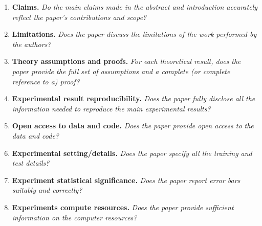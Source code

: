 \documentclass[11pt]{article}
\begin{document}
\begin{enumerate}[leftmargin=2em,itemsep=4pt]

\item \textbf{Claims.}
\textit{Do the main claims made in the abstract and introduction accurately reflect the paper's contributions and scope?}

\item \textbf{Limitations.}
\textit{Does the paper discuss the limitations of the work performed by the authors?}

\item \textbf{Theory assumptions and proofs.}
\textit{For each theoretical result, does the paper provide the full set of assumptions and a complete (or complete reference to a) proof?}

\item \textbf{Experimental result reproducibility.}
\textit{Does the paper fully disclose all the information needed to reproduce the main experimental results?}

\item \textbf{Open access to data and code.}
\textit{Does the paper provide open access to the data and code?}

\item \textbf{Experimental setting/details.}
\textit{Does the paper specify all the training and test details?}

\item \textbf{Experiment statistical significance.}
\textit{Does the paper report error bars suitably and correctly?}

\item \textbf{Experiments compute resources.}
\textit{Does the paper provide sufficient information on the computer resources?}


\end{enumerate}
\end{document}

